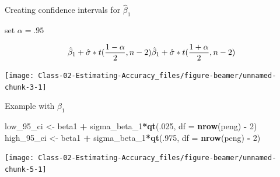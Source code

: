 \documentclass[
  ignorenonframetext,
]{beamer}
\newenvironment{Shaded}{\begin{snugshade}}{\end{snugshade}}
\newcommand{\DataTypeTok}[1]{\textcolor[rgb]{0.13,0.29,0.53}{#1}}
\newcommand{\DecValTok}[1]{\textcolor[rgb]{0.00,0.00,0.81}{#1}}
\newcommand{\KeywordTok}[1]{\textcolor[rgb]{0.13,0.29,0.53}{\textbf{#1}}}
\newcommand{\NormalTok}[1]{#1}
\newcommand{\OperatorTok}[1]{\textcolor[rgb]{0.81,0.36,0.00}{\textbf{#1}}}
\newcommand{\StringTok}[1]{\textcolor[rgb]{0.31,0.60,0.02}{#1}}
\begin{document}
\begin{frame}{Creating confidence intervals for \(\hat\beta_1\)}
\protect\hypertarget{creating-confidence-intervals-for-hatbeta_1}{}

set \(\alpha = .95\)

\[
\hat\beta_1 + \hat\sigma * t(\frac{1-\alpha}{2}, n - 2) \\
\hat\beta_1 + \hat\sigma * t(\frac{1+\alpha}{2}, n - 2)
\]

\begin{center}\texttt{[image: Class-02-Estimating-Accuracy\_files/figure-beamer/unnamed-chunk-3-1]} \end{center}

\end{frame}

\begin{frame}[fragile]{Example with \(\beta_1\)}
\protect\hypertarget{example-with-beta_1}{}

\begin{Shaded}
\begin{Highlighting}[]
\NormalTok{low_}\DecValTok{95}\NormalTok{_ci <-}\StringTok{ }\NormalTok{beta1 }\OperatorTok{+}\StringTok{ }\NormalTok{sigma_beta_}\DecValTok{1}\OperatorTok{*}\KeywordTok{qt}\NormalTok{(.}\DecValTok{025}\NormalTok{, }\DataTypeTok{df =} \KeywordTok{nrow}\NormalTok{(peng) }\OperatorTok{-}\StringTok{ }\DecValTok{2}\NormalTok{)}
\NormalTok{high_}\DecValTok{95}\NormalTok{_ci <-}\StringTok{ }\NormalTok{beta1 }\OperatorTok{+}\StringTok{ }\NormalTok{sigma_beta_}\DecValTok{1}\OperatorTok{*}\KeywordTok{qt}\NormalTok{(.}\DecValTok{975}\NormalTok{, }\DataTypeTok{df =} \KeywordTok{nrow}\NormalTok{(peng) }\OperatorTok{-}\StringTok{ }\DecValTok{2}\NormalTok{)}
\end{Highlighting}
\end{Shaded}

\begin{center}\texttt{[image: Class-02-Estimating-Accuracy\_files/figure-beamer/unnamed-chunk-5-1]} \end{center}

\end{frame}
\end{document}
